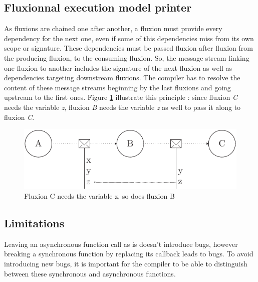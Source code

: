 \subsection{Fluxionnal execution model printer}



















As fluxions are chained one after another, a fluxion must provide every dependency for the next one, even if some of this dependencies miss from its own scope or signature.
These dependencies must be passed fluxion after fluxion from the producing fluxion, to the consuming fluxion.
So, the message stream linking one fluxion to another includes the signature of the next fluxion as well as dependencies targeting downstream fluxions.
The compiler has to resolve the content of these message streams beginning by the last fluxions and going upstream to the first ones.
Figure \ref{fig:streamline} illustrate this principle : since fluxion \textit{C} needs the variable \textit{z}, fluxion \textit{B} needs the variable \textit{z} as well to pass it along to fluxion \textit{C}.

\begin{figure}[h!]
  \includegraphics[width=\linewidth]{ressources/streamline.pdf}
  \caption{Fluxion C needs the variable z, so does fluxion B}
  \label{fig:streamline}
\end{figure}

\subsection{Limitations} \label{ss:Limitations}

Leaving an asynchronous function call as is doesn't introduce bugs, however breaking a synchronous function by replacing its callback leads to bugs.
To avoid introducing new bugs, it is important for the compiler to be able to distinguish between these synchronous and asynchronous functions.

